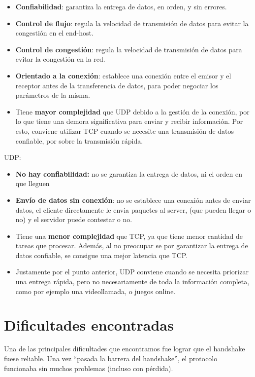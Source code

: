 \documentclass{article}
\begin{document}
\begin{itemize}
\item
  \textbf{Confiabilidad}: garantiza la entrega de datos, en orden, y sin errores.
\item
  \textbf{Control de flujo}: regula la velocidad de transmisión de datos para evitar la congestión en el end-host.
\item
  \textbf{Control de congestión}: regula la velocidad de transmisión de datos para evitar la congestión en la red.
\item
  \textbf{Orientado a la conexión}: establece una conexión entre el emisor y el receptor antes de la transferencia de datos, para poder negociar los parámetros de la misma.
\item
  Tiene \textbf{mayor complejidad} que UDP debido a la gestión de la conexión, por lo que tiene una demora significativa para enviar y recibir información. Por esto, conviene utilizar TCP cuando se necesite una transmisión de datos confiable, por sobre la transmisión rápida.
\end{itemize}

UDP:

\begin{itemize}
\item
  \textbf{No hay confiabilidad:} no se garantiza la entrega de datos, ni el orden en que lleguen
\item
  \textbf{Envío de datos sin conexión}: no se establece una conexión antes de enviar datos, el cliente directamente le envia paquetes al server, (que pueden llegar o no) y el servidor puede contestar o no.
\item
  Tiene una \textbf{menor complejidad} que TCP, ya que tiene menor cantidad de tareas que procesar. Además, al no preocupar se por garantizar la entrega de datos confiable, se consigue una mejor latencia que TCP.
\item
  Justamente por el punto anterior, UDP conviene cuando se necesita priorizar una entrega rápida, pero no necesariamente de toda la información completa, como por ejemplo una videollamada, o juegos online.
\end{itemize}

\section{\texorpdfstring{\textbf{Dificultades
encontradas}}{Dificultades encontradas}}\label{dificultades-encontradas}

Una de las principales dificultades que encontramos fue lograr que el handshake fuese reliable. Una vez ``pasada la barrera del handshake'', el protocolo funcionaba sin muchos problemas (incluso con pérdida).
\end{document}
